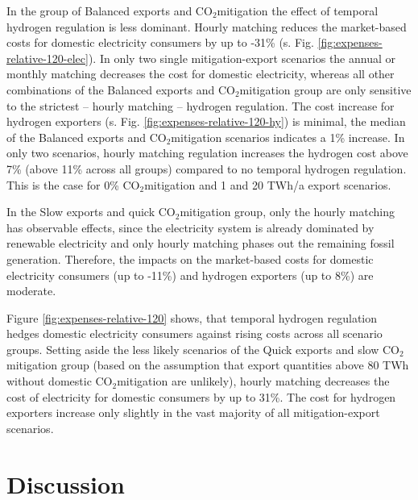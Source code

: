 \documentclass[5p,numafflabel]{elsarticle}
\newcommand{\co}{\ce{CO2}~}
\def\co{CO${}_2${\:}}
\begin{document}
In the group of Balanced exports and \co mitigation the effect of temporal hydrogen regulation is less dominant.
Hourly matching reduces the market-based costs for domestic electricity consumers by up to -31\% (s. Fig. \ref{fig:expenses-relative-120-elec}). In only two single mitigation-export scenarios the annual or monthly matching decreases the cost for domestic electricity, whereas all other combinations of the Balanced exports and \co mitigation group are only sensitive to the strictest -- hourly matching -- hydrogen regulation. 
The cost increase for hydrogen exporters (s. Fig. \ref{fig:expenses-relative-120-hy}) is minimal, the median of the Balanced exports and \co mitigation scenarios indicates a 1\% increase.
In only two scenarios, hourly matching regulation increases the hydrogen cost above 7\% (above 11\% across all groups) compared to no temporal hydrogen regulation. This is the case for 0\% \co mitigation and 1 and 20 TWh/a export scenarios. 

In the Slow exports and quick \co mitigation group, only the hourly matching has observable effects, since the electricity system is already dominated by renewable electricity and only hourly matching phases out the remaining fossil generation. Therefore, the impacts on the market-based costs for domestic electricity consumers (up to -11\%) and hydrogen exporters (up to 8\%) are moderate.

Figure \ref{fig:expenses-relative-120} shows, that temporal hydrogen regulation hedges domestic electricity consumers against rising costs across all scenario groups.
Setting aside the less likely scenarios of the Quick exports and slow \co mitigation group (based on the assumption that export quantities above 80 TWh without domestic \co mitigation are unlikely), hourly matching decreases the cost of electricity for domestic consumers by up to 31\%. The cost for hydrogen exporters increase only slightly in the vast majority of all mitigation-export scenarios.


\section*{Discussion}
\label{sec:discussion}
\end{document}
